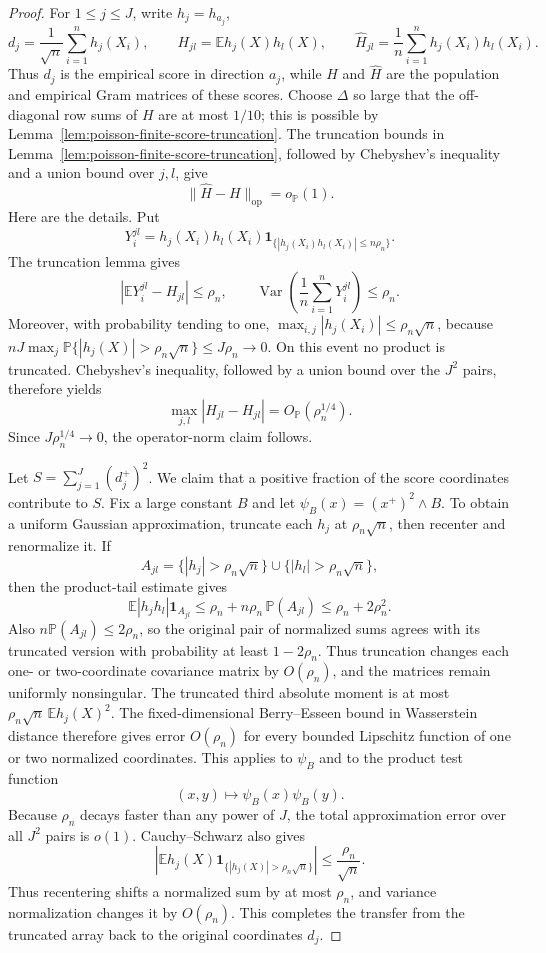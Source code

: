 \documentclass[11pt]{article}
\theoremstyle{definition}
\numberwithin{equation}{section}
\newcommand{\E}{\mathbb{E}}
\newcommand{\wh}{\widehat}
\newcommand{\op}{\mathrm{op}}
\DeclareMathOperator{\Var}{Var}
\begin{document}
\begin{proof}
For \(1\le j\le J\), write \(h_j=h_{a_j}\),
\[
    d_j=\frac1{\sqrt n}\sum_{i=1}^n h_j(X_i),
    \qquad
    H_{jl}=\E h_j(X)h_l(X),
    \qquad
    \wh H_{jl}=\frac1n\sum_{i=1}^n h_j(X_i)h_l(X_i).
\]
Thus \(d_j\) is the empirical score in direction \(a_j\), while \(H\) and
\(\wh H\) are the population and empirical Gram matrices of these scores.
Choose \(\Delta\) so large that the off-diagonal row sums of \(H\) are at most \(1/10\); this is possible by Lemma~\ref{lem:poisson-finite-score-truncation}. The truncation bounds in Lemma~\ref{lem:poisson-finite-score-truncation}, followed by Chebyshev's inequality and a union bound over \(j,l\), give
\[
    \|\wh H-H\|_{\op}=o_{\mathbb P}(1).
\]
Here are the details. Put
\[
    Y_i^{jl}
    =
    h_j(X_i)h_l(X_i)
    \mathbf 1_{\{|h_j(X_i)h_l(X_i)|\le n\rho_n\}}.
\]
The truncation lemma gives
\[
    |\E Y_i^{jl}-H_{jl}|\le\rho_n,
    \qquad
    \Var\left(\frac1n\sum_{i=1}^nY_i^{jl}\right)\le\rho_n.
\]
Moreover, with probability tending to one,
\(\max_{i,j}|h_j(X_i)|\le\rho_n\sqrt n\), because
\(nJ\max_j\mathbb P\{|h_j(X)|>\rho_n\sqrt n\}\le J\rho_n\to0\).
On this event no product is truncated. Chebyshev's inequality, followed by a
union bound over the \(J^2\) pairs, therefore yields
\[
    \max_{j,l}|\wh H_{jl}-H_{jl}|
    =O_{\mathbb P}(\rho_n^{1/4}).
\]
Since \(J\rho_n^{1/4}\to0\), the operator-norm claim follows.

Let \(S=\sum_{j=1}^J(d_j^+)^2\). We claim that a positive fraction of
the score coordinates contribute to \(S\). Fix a large constant \(B\) and
let \(\psi_B(x)=(x^+)^2\wedge B\). To obtain a uniform Gaussian
approximation, truncate each \(h_j\) at \(\rho_n\sqrt n\), then recenter and
renormalize it. If
\[
 A_{jl}=\{|h_j|>\rho_n\sqrt n\}\cup
        \{|h_l|>\rho_n\sqrt n\},
\]
then the product-tail estimate gives
\[
 \mathbb E|h_jh_l|\mathbf 1_{A_{jl}}
 \le \rho_n+n\rho_n\,\mathbb P(A_{jl})
 \le \rho_n+2\rho_n^2.
\]
Also \(n\mathbb P(A_{jl})\le2\rho_n\), so the original pair of normalized
sums agrees with its truncated version with probability at least
\(1-2\rho_n\).
Thus truncation changes each one- or two-coordinate covariance matrix by
\(O(\rho_n)\), and the matrices remain uniformly nonsingular. The truncated
third absolute moment is at most
\(\rho_n\sqrt n\,\mathbb E h_j(X)^2\). The fixed-dimensional
Berry--Esseen bound in Wasserstein distance therefore gives error
\(O(\rho_n)\) for every bounded Lipschitz function of one or two normalized
coordinates. This applies to \(\psi_B\) and to the product test function
\[
 (x,y)\longmapsto\psi_B(x)\psi_B(y).
\]
Because \(\rho_n\) decays faster than any power of \(J\), the total
approximation error over all \(J^2\) pairs is \(o(1)\). Cauchy--Schwarz also
gives
\[
 \left|\mathbb E h_j(X)\mathbf 1_{\{|h_j(X)|>\rho_n\sqrt n\}}\right|
 \le \frac{\rho_n}{\sqrt n}.
\]
Thus recentering shifts a normalized sum by at most \(\rho_n\), and variance
normalization changes it by \(O(\rho_n)\). This completes the transfer from
the truncated array back to the original coordinates \(d_j\).


\end{proof}
\end{document}
